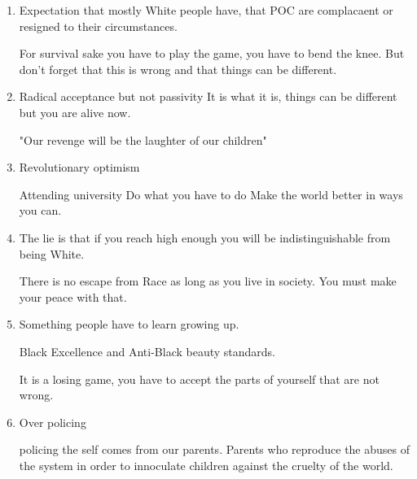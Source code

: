 \documentclass{report}
\begin{document}
\begin{enumerate}
\begin{description}
\begin{enumerate}
                    \item Expectation that mostly White people
                        have, that POC are complacaent or
                        resigned to their circumstances.

                        For survival sake you have to play the
                        game, you have to bend the knee. But
                        don't forget that this is wrong and
                        that things can be different.

                    \item Radical acceptance but not passivity
                        It is what it is, things can be
                        different but you are alive now.

                        "Our revenge will be the laughter of
                        our children"

                    \item Revolutionary optimism
                        
                        Attending university
                        Do what you have to do
                        Make the world better in ways you can.

                    \item The lie is that if you reach high enough
                        you will be indistinguishable from being
                        White.

                        There is no escape from Race as long as you live
                        in society. You must make your peace with that.

                    \item Something people have to learn growing up.

                        Black Excellence and Anti-Black beauty
                        standards.

                        It is a losing game, you have to accept the
                        parts of yourself that are not wrong.

                    \item Over policing

                        policing the self comes from our parents.
                        Parents who reproduce the abuses of the
                        system in order to innoculate children
                        against the cruelty of the world.
                \end{enumerate}


\end{description}
\end{enumerate}
\end{document}
